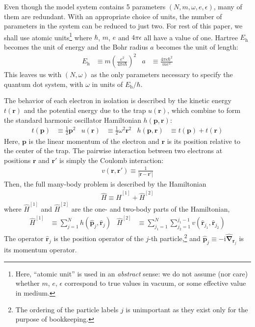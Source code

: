 Even though the model system contains 5 parameters $(N, m, \omega, e, \epsilon)$, many of them are redundant.  With an appropriate choice of units, the number of parameters in the system can be reduced to just two.  For rest of this paper, we shall use atomic units\footnote{Here, ``atomic unit'' is used in an \emph{abstract} sense: we do not assume (nor care) whether $m$, $e$, $\epsilon$ correspond to true values in vacuum, or some effective value in medium.} where $\hbar$, $m$, $e$ and $4 \pi \epsilon$ all have a value of one.  Hartree $E_{\mathrm{h}}$ becomes the unit of energy and the Bohr radius $a$ becomes the unit of length:
\begin{align*}
  E_{\mathrm{h}} &\equiv m \left(\frac{e^2}{4 \pi \epsilon \hbar}\right)^2 &
  a &\equiv \frac{4 \pi \epsilon \hbar^2}{m e^2}
\end{align*}
This leaves us with $(N, \omega)$ as the only parameters necessary to specify the quantum dot system, with $\omega$ in units of $E_{\mathrm{h}} / \hbar$.

The behavior of each electron in isolation is described by the kinetic energy $t(\bm{r})$ and the potential energy due to the trap $u(\bm{r})$, which combine to form the standard harmonic oscillator Hamiltonian $h(\bm{p}, \bm{r})$:
\begin{align*}
  t(\bm{p}) &\equiv \frac{1}{2} \bm{p}^2 &
  u(\bm{r}) &\equiv \frac{1}{2} \omega^2 \bm{r}^2 &
  h(\bm{p}, \bm{r}) &\equiv t(\bm{p}) + t(\bm{r})
\end{align*}
Here, $\bm{p}$ is the linear momentum of the electron and $\bm{r}$ is its position relative to the center of the trap.  The pairwise interaction between two electrons at positions $\bm{r}$ and $\bm{r}'$ is simply the Coulomb interaction:
\begin{align*}
  v(\bm{r}, \bm{r}') \equiv \frac{1}{|\bm{r} - \bm{r}'|}
\end{align*}
Then, the full many-body problem is described by the Hamiltonian
\begin{align*}
  \hat H \equiv \hat H^{[1]} + \hat H^{[2]}
\end{align*}
where $\hat{H}^{[1]}$ and $\hat{H}^{[2]}$ are the one- and two-body parts of the Hamiltonian,
\begin{align} \label{eq:onetwobodyhamiltonian}
\hat{H}^{[1]} &\equiv \sum_{j = 1}^N h(\hat{\bm p}_j, \hat{\bm r}_j) &
\hat{H}^{[2]} &\equiv \sum_{j_1 = 1}^N \sum_{j_2 = 1}^{j_1 - 1} v(\hat{\bm r}_{j_1}, \hat{\bm r}_{j_2})
\end{align}
The operator $\hat{\bm r}_j$ is the position operator of the $j$-th particle,\footnote{The ordering of the particle labels $j$ is unimportant as they exist only for the purpose of bookkeeping.} and $\hat{\bm p}_j \equiv -\mathrm{i} \hat{\bm{\nabla}}_{\bm{r}_j}$ is its momentum operator.

